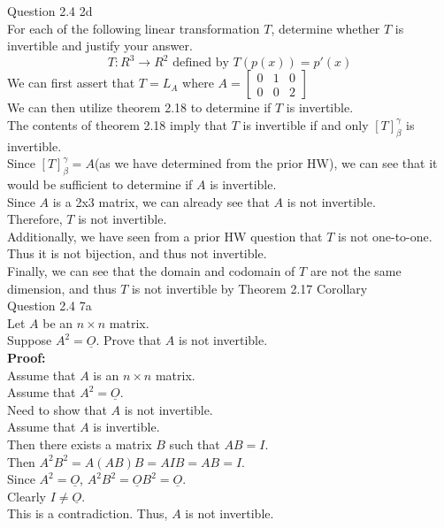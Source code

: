\documentclass[answers,12pt,addpoints]{exam}
\begin{document}
\begin{questions}
\question Question 2.4 2d\\
For each of the following linear transformation $T$, determine whether $T$ is invertible and justify your answer.
$$T: R^3 \to R^2 \text{ defined by } T(p(x)) = p'(x)$$
We can first assert that $T = L_A$ where $A = \begin{bmatrix} 0 & 1 & 0 \\ 0 & 0 & 2 \end{bmatrix}$\\
We can then utilize theorem 2.18 to determine if $T$ is invertible.\\
The contents of theorem 2.18 imply that $T$ is invertible if and only $[T]_\beta^\gamma$ is invertible.\\
Since $[T]_\beta^\gamma = A$(as we have determined from the prior HW), we can see that it would be sufficient to determine if $A$ is invertible.\\
Since $A$ is a 2x3 matrix, we can already see that $A$ is not invertible.\\
Therefore, $T$ is not invertible.\\
Additionally, we have seen from a prior HW question that $T$ is not one-to-one.\\
Thus it is not bijection, and thus not invertible.\\
Finally, we can see that the domain and codomain of $T$ are not the same dimension, and thus $T$ is not invertible by Theorem 2.17 Corollary \\

\question Question 2.4 7a\\
Let $A$ be an $n \times n$ matrix. \\
Suppose $A^2 = \underline{O}$. Prove that $A$ is not invertible.\\
\textbf{Proof:}\\
Assume that $A$ is an $n \times n$ matrix.\\
Assume that $A^2 = \underline{O}$.\\
Need to show that $A$ is not invertible.\\
Assume that $A$ is invertible.\\
Then there exists a matrix $B$ such that $AB = I$.\\
Then $A^2B^2 = A(AB)B = AIB = AB = I$.\\
Since $A^2 = \underline{O}$, $A^2B^2 = \underline{O}B^2 = \underline{O}$.\\
Clearly $I \neq \underline{O}$.\\
This is a contradiction. Thus, $A$ is not invertible.\\


\end{questions}
\end{document}
